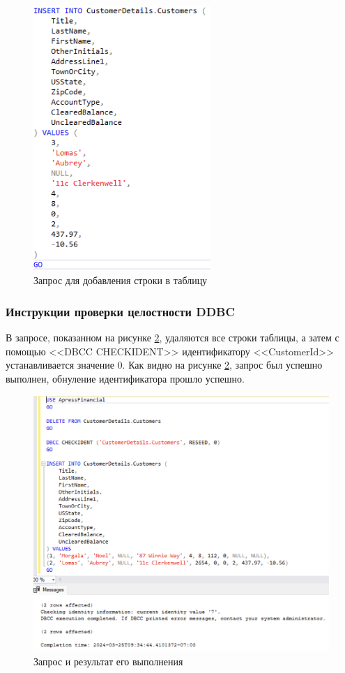 \documentclass[a4paper, 14pt]{extarticle}
\begin{document}
\begin{figure}[H]
  \centering
  \includegraphics[width=0.6\textwidth]{images/task-1/9.png}
  \caption{Запрос для добавления строки в таблицу}
  \label{fig:task-1-9}
\end{figure}

\subsubsection{Инструкции проверки целостности DDBC}

В запросе, показанном на рисунке \ref{fig:task-1-10}, удаляются все строки
таблицы, а затем с помощью <<\foreignlanguage{english}{DBCC CHECKIDENT}>>
идентификатору <<\foreignlanguage{english}{CustomerId}>> устанавливается
значение 0. Как видно на рисунке \ref{fig:task-1-10}, запрос был успешно
выполнен, обнуление идентификатора прошло успешно.

\begin{figure}[H]
  \centering
  \includegraphics[width=\textwidth]{images/task-1/10.png}
  \caption{Запрос и результат его выполнения}
  \label{fig:task-1-10}
\end{figure}
\end{document}
